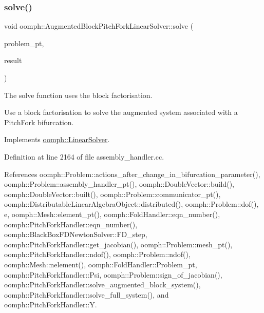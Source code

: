 \mbox{\label{classoomph_1_1AugmentedBlockPitchForkLinearSolver_a0cbeb150ac83d5be1a1e30c0f728a70b}} 
\subsubsection{\texorpdfstring{solve()}{solve()}\hspace{0.1cm}{\footnotesize\ttfamily [1/3]}}
{\footnotesize\ttfamily void oomph\+::\+Augmented\+Block\+Pitch\+Fork\+Linear\+Solver\+::solve (\begin{DoxyParamCaption}\item[{\hyperlink{classoomph_1_1Problem}{Problem} $\ast$const \&}]{problem\+\_\+pt,  }\item[{\hyperlink{classoomph_1_1DoubleVector}{Double\+Vector} \&}]{result }\end{DoxyParamCaption})\hspace{0.3cm}{\ttfamily [virtual]}}



The solve function uses the block factorisation. 

Use a block factorisation to solve the augmented system associated with a Pitch\+Fork bifurcation. 

Implements \hyperlink{classoomph_1_1LinearSolver_a15ce22542b74ed1826ea485edacbeb6e}{oomph\+::\+Linear\+Solver}.



Definition at line 2164 of file assembly\+\_\+handler.\+cc.



References oomph\+::\+Problem\+::actions\+\_\+after\+\_\+change\+\_\+in\+\_\+bifurcation\+\_\+parameter(), oomph\+::\+Problem\+::assembly\+\_\+handler\+\_\+pt(), oomph\+::\+Double\+Vector\+::build(), oomph\+::\+Double\+Vector\+::built(), oomph\+::\+Problem\+::communicator\+\_\+pt(), oomph\+::\+Distributable\+Linear\+Algebra\+Object\+::distributed(), oomph\+::\+Problem\+::dof(), e, oomph\+::\+Mesh\+::element\+\_\+pt(), oomph\+::\+Fold\+Handler\+::eqn\+\_\+number(), oomph\+::\+Pitch\+Fork\+Handler\+::eqn\+\_\+number(), oomph\+::\+Black\+Box\+F\+D\+Newton\+Solver\+::\+F\+D\+\_\+step, oomph\+::\+Pitch\+Fork\+Handler\+::get\+\_\+jacobian(), oomph\+::\+Problem\+::mesh\+\_\+pt(), oomph\+::\+Pitch\+Fork\+Handler\+::ndof(), oomph\+::\+Problem\+::ndof(), oomph\+::\+Mesh\+::nelement(), oomph\+::\+Fold\+Handler\+::\+Problem\+\_\+pt, oomph\+::\+Pitch\+Fork\+Handler\+::\+Psi, oomph\+::\+Problem\+::sign\+\_\+of\+\_\+jacobian(), oomph\+::\+Pitch\+Fork\+Handler\+::solve\+\_\+augmented\+\_\+block\+\_\+system(), oomph\+::\+Pitch\+Fork\+Handler\+::solve\+\_\+full\+\_\+system(), and oomph\+::\+Pitch\+Fork\+Handler\+::Y.

